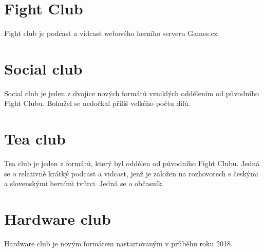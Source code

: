 \documentclass[a4paper]{article}
\begin{document}
\section*{Fight Club}

{\color{white}
Fight club je podcast a vidcast webového herního serveru Games.cz.
}

\hspace{0pt}  %




\newpage
\section*{Social club}

{\color{white}
Social club je jeden z dvojice nových formátů vzniklých oddělením od původního 
Fight Clubu. Bohužel se nedočkal příliš velkého počtu dílů.
}

\hspace{0pt}  %




\newpage
\section*{Tea club}

{\color{white}
Tea club je jeden z formátů, který byl oddělen od původního Fight Clubu. Jedná
se o relativně krátký podcast a vidcast, jenž je založen na rozhovorech 
s českými a slovenskými herními tvůrci. Jedná se o občasník.
}

\hspace{0pt}  %




\newpage
\section*{Hardware club}

{\color{white}
Hardware club je novým formátem nastartovaným v průběhu roku 2018.
}

\hspace{0pt}  %

\end{document}
